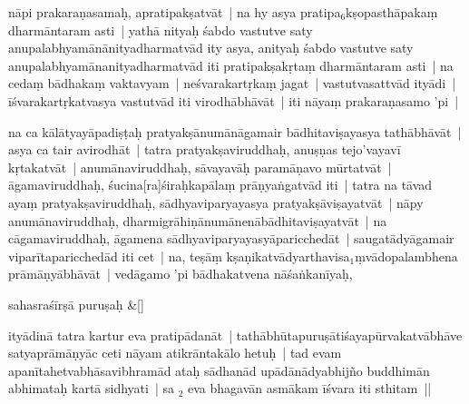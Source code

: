 \documentclass[article,12pt,a4paper]{memoir}%
\newcounter{parCount}
\begin{document}
	  \pstart \leavevmode%
	\label{thakur75-38.14}nāpi prakaraṇasamaḥ, apratipakṣatvāt | na hy asya pratipa{\tiny $_{6}$}kṣopasthāpakaṃ dharmāntaram asti | \label{RNAms-add-1-start}yathā nityaḥ śabdo vastutve saty anupalabhyamā\label{ratnakīrtinibandhāvali__36r1PF7IMWHBAID9C9MEN8DPBJV}nānityadharmatvād\label{ratnakīrtinibandhāvali__36r1PF7IMWGLU1HYJ7TI9KDX9AW} ity asya, anityaḥ śabdo vastutve saty anupalabhyamānanityadharmatvād iti pratipakṣakṛtaṃ dharmāntaram asti |\label{RNAms-add-1-end} na cedaṃ bādhakaṃ vaktavyam | neśvarakartṛkaṃ jagat | vastutvasattvād ityādi | īśvarakartṛkatvasya vastutvād iti virodhābhāvāt | iti nāyaṃ prakaraṇasamo 'pi |
	{}
	\pend%
      

	  \pstart \leavevmode%
	\label{thakur75-38.19}na ca kālātyayāpadiṣṭaḥ pratyakṣānumānāgamair bādhitaviṣayasya tathābhāvāt | asya ca tair avirodhāt | tatra pratyakṣaviruddhaḥ, anuṣṇas tejo'vayavī kṛtakatvāt | anumānavi\leavevmode{}\label{RNAms_22a}ruddhaḥ, sāvayavāḥ paramāṇavo mūrtatvāt | āgamaviruddhaḥ, śucina[ra]śiraḥkapālaṃ prāṇyaṅgatvād iti | tatra na tāvad ayaṃ pratyakṣaviruddhaḥ, sādhyaviparyayasya pratyakṣāviṣayatvāt | nāpy anumānaviruddhaḥ, dharmigrāhiṇānumānenābādhitaviṣayatvāt | na cāgamaviruddhaḥ, āgamena sādhyaviparyayasyāparicchedāt | saugatādyāgamair viparītaparicchedād iti cet | na, teṣāṃ kṣaṇikatvādyarthavisa{\tiny $_{1}$}ṃvādopalambhena prāmāṇyābhāvāt | vedāgamo 'pi bādhakatvena nāśaṅkanīyaḥ,
	{}
	\pend%
      
	    
	    \stanza[\smallbreak]
	  sahasraśīrṣā puruṣaḥ \&[\smallbreak]
	  
	  
	  

	  \pstart \leavevmode%
	ityādinā tatra kartur eva pratipādanāt | tathābhūtapuruṣātiśayapūrvakatvābhāve satyaprāmāṇyāc ceti nāyam atikrāntakālo hetuḥ | tad evam apanītahetvabhāsavibhramād ataḥ sādhanād upādānādyabhijño buddhimān abhimataḥ kartā sidhyati | sa {\tiny $_{2}$} eva bhagavān asmākam īśvara iti sthitam ||
	{}
	\pend%
      
\end{document}
